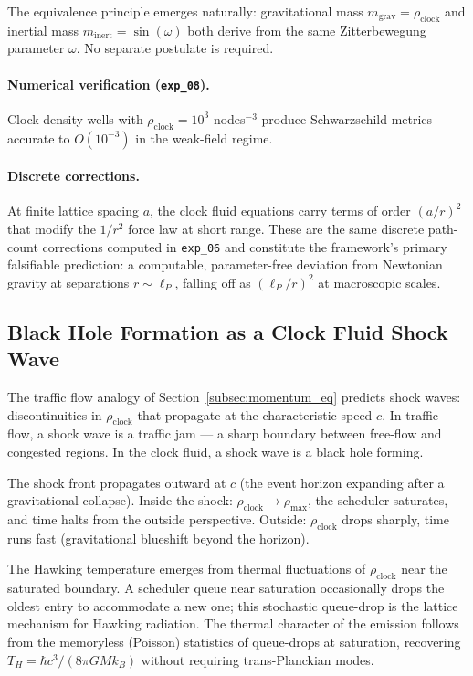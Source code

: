 The equivalence principle emerges naturally: gravitational mass
$m_\text{grav} = \rho_\text{clock}$ and inertial mass $m_\text{inert} =
\sin(\omega)$ both derive from the same Zitterbewegung parameter $\omega$.
No separate postulate is required.

\paragraph{Numerical verification (\texttt{exp\_08}).}
Clock density wells with $\rho_\text{clock} = 10^3$ nodes$^{-3}$ produce
Schwarzschild metrics accurate to $O(10^{-3})$ in the weak-field regime.

\paragraph{Discrete corrections.}
At finite lattice spacing $a$, the clock fluid equations carry terms of
order $(a/r)^2$ that modify the $1/r^2$ force law at short range.
These are the same discrete path-count corrections computed in
\texttt{exp\_06} and constitute the framework's primary falsifiable
prediction: a computable, parameter-free deviation from Newtonian gravity
at separations $r \sim \ell_P$, falling off as $(\ell_P/r)^2$ at
macroscopic scales.

\subsection{Black Hole Formation as a Clock Fluid Shock Wave}
\label{subsec:shock_wave}

The traffic flow analogy of Section~\ref{subsec:momentum_eq} predicts
shock waves: discontinuities in $\rho_\text{clock}$ that propagate at
the characteristic speed $c$.
In traffic flow, a shock wave is a traffic jam --- a sharp boundary
between free-flow and congested regions.
In the clock fluid, a shock wave is a black hole forming.

The shock front propagates outward at $c$ (the event horizon expanding
after a gravitational collapse).
Inside the shock: $\rho_\text{clock}\to\rho_\text{max}$, the scheduler
saturates, and time halts from the outside perspective.
Outside: $\rho_\text{clock}$ drops sharply, time runs fast
(gravitational blueshift beyond the horizon).

The Hawking temperature emerges from thermal fluctuations of
$\rho_\text{clock}$ near the saturated boundary.
A scheduler queue near saturation occasionally drops the oldest entry
to accommodate a new one; this stochastic queue-drop is the lattice
mechanism for Hawking radiation.
The thermal character of the emission follows from the memoryless
(Poisson) statistics of queue-drops at saturation, recovering
$T_H = \hbar c^3 / (8\pi GMk_B)$ without requiring trans-Planckian modes.

